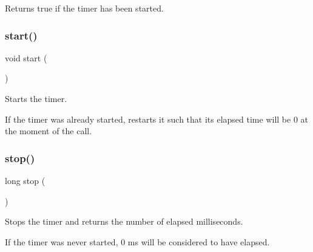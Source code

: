 Returns true if the timer has been started. 

\mbox{\label{classTimer_a60de64d75454385b23995437f1d72669}} 
\subsubsection{\texorpdfstring{start()}{start()}}
{\footnotesize\ttfamily void start (\begin{DoxyParamCaption}{ }\end{DoxyParamCaption})}



Starts the timer. 

If the timer was already started, restarts it such that its \textquotesingle{}elapsed\textquotesingle{} time will be 0 at the moment of the call. \mbox{\label{classTimer_aeaafdf74a35ee2a5308e0b421f87b6a5}} 
\subsubsection{\texorpdfstring{stop()}{stop()}}
{\footnotesize\ttfamily long stop (\begin{DoxyParamCaption}{ }\end{DoxyParamCaption})}



Stops the timer and returns the number of elapsed milliseconds. 

If the timer was never started, 0 ms will be considered to have elapsed. 